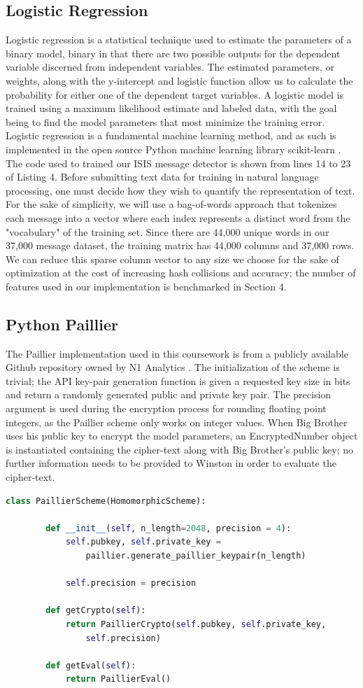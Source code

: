 \documentclass[10pt, a4paper]{article}
\begin{document}
		\subsection{Logistic Regression}
	Logistic regression is a statistical technique used to estimate the parameters of a binary model, binary in that there are two possible outputs for the dependent variable discerned from independent variables. The estimated parameters, or weights, along with the y-intercept and logistic function allow us to calculate the probability for either one of the dependent target variables. A logistic model is trained using a maximum likelihood estimate and labeled data, with the goal being to find the model parameters that most minimize the training error. Logistic regression is a fundamental machine learning method, and as such is implemented in the open source Python machine learning library scikit-learn \cite{scikit-learn}. The code used to trained our ISIS message detector is shown from lines 14 to 23 of Listing 4. Before submitting text data for training in natural language processing, one must decide how they wish to quantify the representation of text. For the sake of simplicity, we will use a bag-of-words approach that tokenizes each message into a vector where each index represents a distinct word from the "vocabulary" of the training set. Since there are 44,000 unique words in our 37,000 message dataset, the training matrix has 44,000 columns and 37,000 rows. We can reduce this sparse column vector to any size we choose for the sake of optimization at the cost of increasing hash collisions and accuracy; the number of features used in our implementation is benchmarked in Section 4.
	
	
		\subsection{Python Paillier}
	The Paillier implementation used in this coursework is from a publicly available Github repository owned by N1 Analytics \cite{python-paillier}.  The initialization of the scheme is trivial; the API key-pair generation function is given a requested key size in bits and return a randomly generated public and private key pair. The precision argument is used during the encryption process for rounding floating point integers, as the Paillier scheme only works on integer values. When Big Brother uses his public key to encrypt the model parameters, an EncryptedNumber object is instantiated containing the cipher-text along with Big Brother's public key; no further information needs to be provided to Winston in order to evaluate the cipher-text. 
	\begin{lstlisting}[language=Python,caption = Paillier Scheme Initialization]
		class PaillierScheme(HomomorphicScheme):
		
		def __init__(self, n_length=2048, precision = 4):
			self.pubkey, self.private_key = 
				paillier.generate_paillier_keypair(n_length)
				
			self.precision = precision
		
		def getCrypto(self):
			return PaillierCrypto(self.pubkey, self.private_key, 
				self.precision)
		
		def getEval(self):
			return PaillierEval()
	\end{lstlisting}
\end{document}

